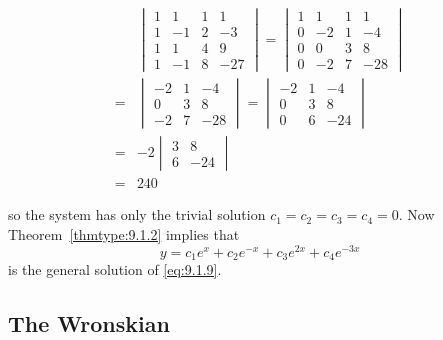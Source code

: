 \documentclass{ximera}
\begin{document}
\begin{example}
\begin{explanation}
\begin{equation} \label{eq:9.1.12}
\begin{array}{ll}
&\begin{vmatrix}1&1&1&1\\1&-1&2&-3\\1&1&4&9\\
1&-1&8&-27\end{vmatrix}=
\begin{vmatrix}1&1&1&1\\0&-2&1&-4\\0&0&3&8\\
0&-2&7&-28\end{vmatrix}\\
=&\begin{vmatrix}-2&1&-4\\0&3&8\\
-2&7&-28\end{vmatrix}
=\begin{vmatrix}-2&1&-4\\0&3&8
\\0&6&-24\end{vmatrix}\\
=&-2\begin{vmatrix}3&8\\6&-24\end{vmatrix}\\
=&240
\end{array}
\end{equation}

so the system has only the trivial solution $c_1=c_2=c_3=c_4=0$.
Now Theorem~\ref{thmtype:9.1.2} implies that
$$
y=c_1e^x+c_2e^{-x}+c_3e^{2x}+c_4e^{-3x}
$$
is the general solution of \eqref{eq:9.1.9}.

\end{explanation}
\end{example}

\subsection*{The Wronskian}
\end{document}

